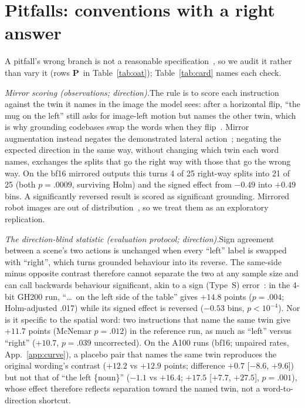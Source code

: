 \documentclass[conference]{IEEEtran}
\newcommand{\pit}{\textcolor{pitc}{\textbf{P}}}
\newcommand{\head}[1]{\textit{#1}\hspace{0.4em}}
\begin{document}
\section{Pitfalls: conventions with a right answer}
\label{sec:pitfalls}

A pitfall's wrong branch is not a reasonable specification~\cite{simonsohn2020specification}, so we audit it rather than vary it (rows \pit\ in Table~\ref{tab:oat}); Table~\ref{tab:card} names each check.

\head{Mirror scoring (observations; direction).}The rule is to score each instruction against the twin it names in the image the model sees: after a horizontal flip, ``the mug on the left'' still asks for image-left motion but names the other twin, which is why grounding codebases swap the words when they flip~\cite{kamath2021mdetr,deng2021transvg}. Mirror augmentation instead negates the demonstrated lateral action~\cite{zhuang2025mirrorduo}; negating the expected direction in the same way, without changing which twin each word names, exchanges the splits that go the right way with those that go the wrong way. On the bf16 mirrored outputs this turns 4 of 25 right-way splits into 21 of 25 (both $p=.0009$, surviving Holm) and the signed effect from $-0.49$ into $+0.49$ bins. A significantly reversed result is scored as significant grounding. Mirrored robot images are out of distribution~\cite{zhuang2025mirrorduo}, so we treat them as an exploratory replication.

\head{The direction-blind statistic (evaluation protocol; direction).}Sign agreement between a scene's two actions is unchanged when every ``left'' label is swapped with ``right'', which turns grounded behaviour into its reverse. The same-side minus opposite contrast therefore cannot separate the two at any sample size and can call backwards behaviour significant, akin to a sign (Type~S) error~\cite{gelman2014beyond}: in the 4-bit GH200 run, ``\dots\ on the left side of the table'' gives $+14.8$ points ($p=.004$; Holm-adjusted .017) while its signed effect is reversed ($-0.53$ bins, $p<10^{-4}$). Nor is it specific to the spatial word: two instructions that name the same twin give $+11.7$ points (McNemar $p=.012$) in the reference run, as much as ``left'' versus ``right'' ($+10.7$, $p=.039$ uncorrected). On the A100 runs (bf16; unpaired rates, App.~\ref{app:curve}), a placebo pair that names the same twin reproduces the original wording's contrast ($+12.2$ vs $+12.9$ points; difference $+0.7$ [$-8.6$, $+9.6$]) but not that of ``the left \{noun\}'' ($-1.1$ vs $+16.4$; $+17.5$ [$+7.7$, $+27.5$], $p=.001$), whose effect therefore reflects separation toward the named twin, not a word-to-direction shortcut.
\end{document}
